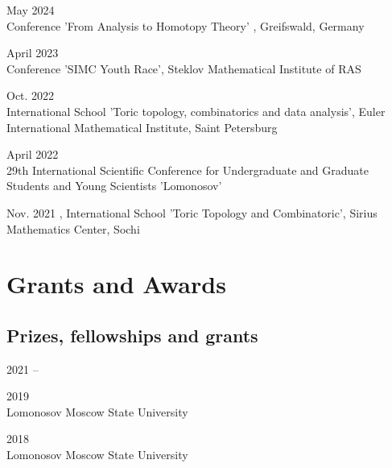 \documentclass[11pt,letterpaper]{report}
\begin{document}
    \begin{tablist}
         
       \item{May 2024} \\ Conference 'From Analysis to Homotopy Theory' , Greifswald, Germany 
    
       \item{April 2023} \\ Conference 'SIMC Youth Race', Steklov Mathematical Institute of RAS
       
        \item{Oct. 2022} \\ International School 'Toric topology, combinatorics and data analysis', Euler International Mathematical Institute, Saint Petersburg
       
       \item{April 2022} \\ 29th International Scientific Conference for Undergraduate and Graduate Students and Young Scientists 'Lomonosov'
       
         \item{Nov. 2021} , International School
'Toric Topology and Combinatoric', Sirius Mathematics Center, Sochi
          
    \end{tablist}
    
    
    
    
     \section*{Grants and Awards}

    \subsection*{Prizes, fellowships and grants}

    \begin{tablist}

        \item[2021 --]  
        \item[2019] \\ Lomonosov Moscow State University
        \item[2018] \\ Lomonosov Moscow State University

    \end{tablist}
\end{document}

